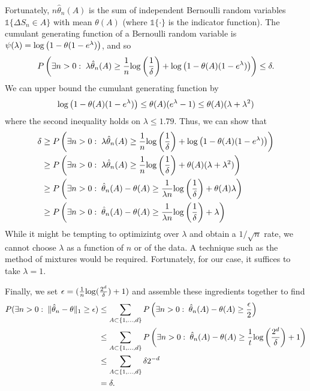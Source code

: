 \documentclass[11pt]{article}
\def\log{{\rm log}}
\begin{document}
Fortunately, $n \hat\theta_n(A)$ is the sum of independent Bernoulli random variables $\mathds{1}\{ \Delta S_n \in A\}$ with mean $\theta(A)$ (where $\mathds{1}\{\cdot\}$ is the indicator function). The cumulant generating function of a Bernoulli random variable is $\psi(\lambda) = \log\left(1 - \theta(1-e^\lambda)\right)$, and so
\[
  P\left(
    \exists n > 0:\;
    \lambda \hat\theta_n(A)
    \geq
    \frac{1}{n}\log\left(\frac{1}{\delta}\right)
    + \log\left(1 - \theta(A)(1-e^\lambda)\right)
  \right)
  \leq \delta.
\]
We can upper bound the cumulant generating function by
\[
  \log\left(1 - \theta(A)(1-e^\lambda)\right)
  \leq
  \theta(A)(e^\lambda-1)
  \leq
  \theta(A)(\lambda+\lambda^2)
\]
where the second inequality holds  on $\lambda \leq 1.79$. Thus, we can show that 
\begin{align*}
  \delta
  &\geq 
    P\left(
    \exists n > 0:\;
    \lambda \hat\theta_n(A)
    \geq
    \frac{1}{n}\log\left(\frac{1}{\delta}\right)
    + \log\left(1 - \theta(A)(1-e^\lambda)\right)
    \right)\\
  &\geq
    P\left(
    \exists n > 0:\;
    \lambda \hat\theta_n(A)
    \geq
    \frac{1}{n}\log\left(\frac{1}{\delta}\right)
    +  \theta(A)(\lambda + \lambda^2)
    \right)\\
  &\geq
    P\left(
    \exists n > 0:\;
    \hat\theta_n(A) - \theta(A)
    \geq
    \frac{1}{\lambda n}\log\left(\frac{1}{\delta}\right)
    +  \theta(A)\lambda
    \right)\\
    &\geq
    P\left(
    \exists n > 0:\;
    \hat\theta_n(A) - \theta(A)
    \geq
    \frac{1}{\lambda n}\log\left(\frac{1}{\delta}\right)
    +  \lambda
    \right)    
\end{align*}
While it might be tempting to optimizintg over $\lambda$ and obtain a $1/\sqrt{n}$ rate, we cannot choose $\lambda$ as a function of $n$ or of the data. A technique such as the method of mixtures \citep{delapena2000moment} would be required. Fortunately, for our case, it suffices to take $\lambda = 1$.

Finally, we set  $\epsilon = (\frac{1}{n}\log(\frac{2^d}{\delta}) + 1)$ and assemble these ingredients together to find
\begin{align*}
  P(\exists n > 0:\; \Vert \hat\theta_n - \theta\Vert_1 \geq \epsilon)
  &\leq
  \sum_{A \subset \{1,\ldots, d\}}
  P\left(\exists n > 0:\; \hat\theta_n(A) - \theta(A) \geq \frac{\epsilon}{2}\right)\\
  &\leq
  \sum_{A \subset \{1,\ldots, d\}}
  P\left(\exists n > 0:\; \hat\theta_n(A) - \theta(A) \geq
    \frac{1}{t}\log\left(\frac{2^d}{\delta}\right) + 1
    \right)\\
  &\leq
  \sum_{A \subset \{1,\ldots, d\}}
    \delta 2^{-d}\\
  & =
    \delta.
\end{align*}
\end{document}
